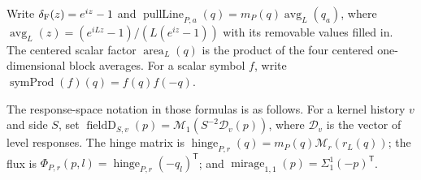 Write $\delta_{\rm F}(z)=e^{iz}-1$ and
$\operatorname{pullLine}_{P,a}(q)=m_P(q)\operatorname{avg}_L(q_a)$,
where $\operatorname{avg}_L(z)=(e^{iLz}-1)/(L(e^{iz}-1))$ with its
removable values filled in. The centered scalar factor
$\operatorname{area}_L(q)$ is the product of the four centered
one-dimensional block averages. For a scalar symbol $f$, write
$\operatorname{symProd}(f)(q)=f(q)f(-q)$.

The response-space notation in those formulas is as follows. For a kernel history
$v$ and side $S$, set
$\operatorname{fieldD}_{S,v}(p)=\mathcal M_1(S^{-2}\mathscr D_v(p))$,
where $\mathscr D_v$ is the vector of level responses. The hinge matrix is
$\operatorname{hinge}_{P,r}(q)=m_P(q)\mathcal M_r(r_L(q))$; the flux is
$\Phi_{P,r}(p,l)=\operatorname{hinge}_{P,r}(-q_l)^{\mathsf T}$; and
$\operatorname{mirage}_{1,1}(p)=\Sigma_1^1(-p)^{\mathsf T}$.

